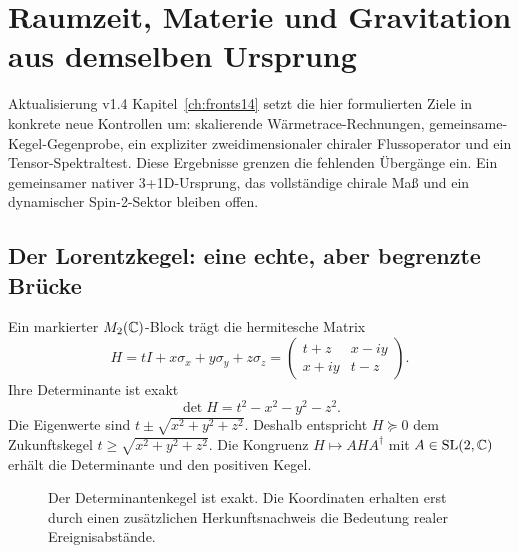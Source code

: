 \chapter{Raumzeit, Materie und Gravitation aus demselben Ursprung}
\label{ch:physik}
\begin{bild}{Aktualisierung v1.4}
Kapitel~\ref{ch:fronts14} setzt die hier formulierten Ziele in konkrete neue Kontrollen um: skalierende Wärmetrace-Rechnungen, gemeinsame-Kegel-Gegenprobe, ein expliziter zweidimensionaler chiraler Flussoperator und ein Tensor-Spektraltest. Diese Ergebnisse grenzen die fehlenden Übergänge ein. Ein gemeinsamer nativer 3+1D-Ursprung, das vollständige chirale Maß und ein dynamischer Spin-2-Sektor bleiben offen.
\end{bild}
\section{Der Lorentzkegel: eine echte, aber begrenzte Brücke}
Ein markierter $M_2(\mathbb C)$-Block trägt die hermitesche Matrix
\begin{equation}
H=tI+x\sigma_x+y\sigma_y+z\sigma_z
=\begin{pmatrix}t+z&x-iy\\x+iy&t-z\end{pmatrix}.
\end{equation}
Ihre Determinante ist exakt
\begin{equation}
\det H=t^2-x^2-y^2-z^2.
\end{equation}
Die Eigenwerte sind $t\pm\sqrt{x^2+y^2+z^2}$. Deshalb entspricht $H\succeq0$ dem Zukunftskegel $t\ge\sqrt{x^2+y^2+z^2}$. Die Kongruenz $H\mapsto AHA^\dagger$ mit $A\in\mathrm{SL}(2,\mathbb C)$ erhält die Determinante und den positiven Kegel.

\begin{figure}[H]\centering
{}
\caption{Der Determinantenkegel ist exakt. Die Koordinaten erhalten erst durch einen zusätzlichen Herkunftsnachweis die Bedeutung realer Ereignisabstände.}
\end{figure}

